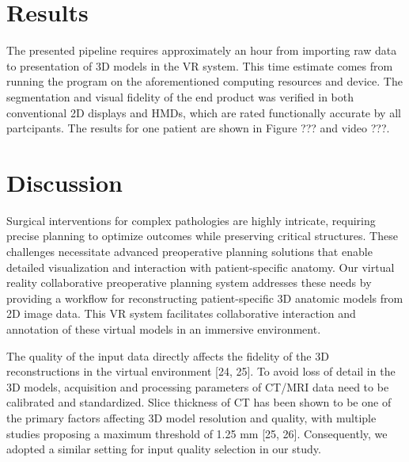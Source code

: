 \documentclass{bmcart}
\begin{document}
\section{Results}
The presented pipeline requires approximately an hour from importing raw data to presentation of 3D models in the VR system. This time estimate comes from running the program on the aforementioned computing resources and device. 
The segmentation and visual fidelity of the end product was verified in both conventional 2D displays and HMDs, which are rated functionally accurate by all partcipants. The results for one patient are shown in Figure ??? and video ???. 
\section{Discussion}
Surgical interventions for complex pathologies are highly intricate, requiring precise planning to optimize outcomes while preserving critical structures. These challenges necessitate advanced preoperative planning solutions that enable detailed visualization and interaction with patient-specific anatomy. Our virtual reality collaborative preoperative planning system addresses these needs by providing a workflow for reconstructing patient-specific 3D anatomic models from 2D image data. This VR system facilitates collaborative interaction and annotation of these virtual models in an immersive environment.

The quality of the input data directly affects the fidelity of the 3D reconstructions in the virtual environment [24, 25]. To avoid loss of detail in the 3D models, acquisition and processing parameters of CT/MRI data need to be calibrated and standardized. Slice thickness of CT has been shown to be one of the primary factors affecting 3D model resolution and quality, with multiple studies proposing a maximum threshold of 1.25 mm [25, 26]. Consequently, we adopted a similar setting for input quality selection in our study.
\end{document}
